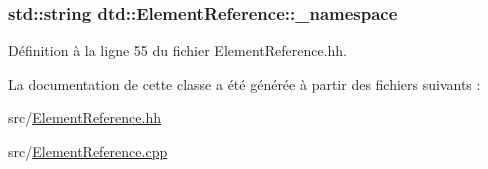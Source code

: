 \hypertarget{classdtd_1_1_element_reference_ae290dc9372690c6ec326ee77594466ec}{
\subsubsection[{\_\-namespace}]{\setlength{\rightskip}{0pt plus 5cm}std::string {\bf dtd::ElementReference::\_\-namespace}}}
\label{classdtd_1_1_element_reference_ae290dc9372690c6ec326ee77594466ec}


Définition à la ligne 55 du fichier ElementReference.hh.



La documentation de cette classe a été générée à partir des fichiers suivants :\begin{DoxyCompactItemize}
\item 
src/\hyperlink{_element_reference_8hh}{ElementReference.hh}\item 
src/\hyperlink{_element_reference_8cpp}{ElementReference.cpp}\end{DoxyCompactItemize}
